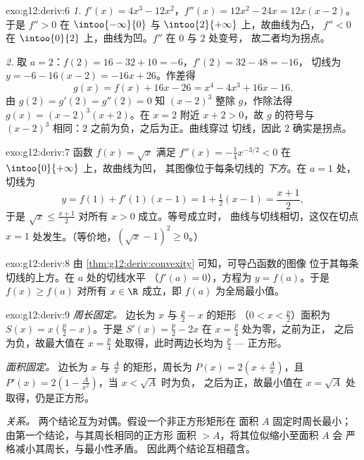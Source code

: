 \begin{solution}{exo:g12:deriv:6}
\emph{1.} $f'(x) = 4x^3 - 12x^2$，$f''(x) = 12x^2 - 24x = 12x(x-2)$。
于是 $f'' > 0$ 在 $\intoo{-\infty}{0}$ 与 $\intoo{2}{+\infty}$ 上，故曲线为凸，
$f'' < 0$ 在 $\intoo{0}{2}$ 上，曲线为凹。$f''$ 在 $0$ 与 $2$ 处变号，
故二者均为拐点。

\emph{2.} 取 $a = 2$：$f(2) = 16 - 32 + 10 = -6$，$f'(2) = 32 - 48 = -16$，
切线为 $y = -6 - 16(x-2) = -16x + 26$。作差得
\[
g(x) = f(x) + 16x - 26 = x^4 - 4x^3 + 16x - 16 .
\]
由 $g(2) = g'(2) = g''(2) = 0$ 知 $(x-2)^3$ 整除 $g$，作除法得
$g(x) = (x-2)^3(x+2)$。在 $x = 2$ 附近 $x + 2 > 0$，故 $g$ 的符号与
$(x-2)^3$ 相同：$2$ 之前为负，之后为正。曲线穿过
切线，因此 $2$ 确实是拐点。
\end{solution}

\begin{solution}{exo:g12:deriv:7}
函数 $f(x) = \sqrt{x}$ 满足
$f''(x) = -\frac{1}{4}x^{-3/2} < 0$ 在 $\intoo{0}{+\infty}$ 上，故曲线为凹，
其图像位于每条切线的 \emph{下方}。在 $a = 1$ 处，切线为
\[
y = f(1) + f'(1)(x - 1) = 1 + \tfrac12 (x-1) = \frac{x+1}{2},
\]
于是 $\sqrt{x} \leq \frac{x+1}{2}$ 对所有 $x > 0$ 成立。等号成立时，
曲线与切线相切，这仅在切点
$x = 1$ 处发生。（等价地，$\left(\sqrt x - 1\right)^2 \geq 0$。）
\end{solution}

\begin{solution}{exo:g12:deriv:8}
由 \cref{thm:g12:deriv:convexity} 可知，可导凸函数的图像
位于其每条切线的上方。在 $a$ 处的切线水平
（$f'(a) = 0$），方程为 $y = f(a)$。于是 $f(x) \geq f(a)$ 对所有
$x \in \R$ 成立，即 $f(a)$ 为全局最小值。
\end{solution}

\begin{solution}{exo:g12:deriv:9}
\emph{周长固定。} 边长为 $x$ 与 $\frac{p}{2} - x$ 的矩形
（$0 < x < \frac p2$）面积为 $S(x) = x\left(\frac p2 - x\right)$。于是
$S'(x) = \frac p2 - 2x$ 在 $x = \frac p4$ 处为零，之前为正，
之后为负，故最大值在 $x = \frac{p}{4}$ 处取得，此时两边长均为
$\frac p4$ --- 正方形。

\emph{面积固定。} 边长为 $x$ 与 $\frac Ax$ 的矩形，周长为
$P(x) = 2\left(x + \frac Ax\right)$，且
$P'(x) = 2\left(1 - \frac{A}{x^2}\right)$，当 $x < \sqrt A$ 时为负，
之后为正，故最小值在 $x = \sqrt{A}$ 处取得，仍是正方形。

\emph{关系。} 两个结论互为对偶。假设一个非正方形矩形在
面积 $A$ 固定时周长最小；由第一个结论，与其周长相同的正方形
面积 $> A$，将其位似缩小至面积 $A$ 会
严格减小其周长，与最小性矛盾。
因此两个结论互相蕴含。
\end{solution}

